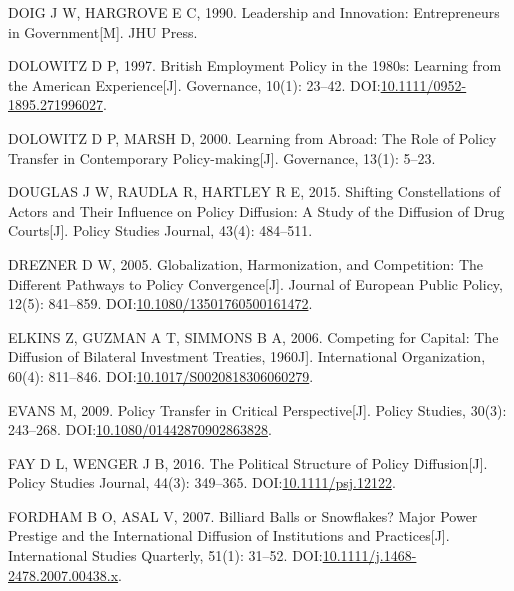 \documentclass[
  12pt,
]{ctexart}
\newlength{\cslhangindent}
\newlength{\cslentryspacingunit} %
\newenvironment{CSLReferences}[2] %
 {%
  \setlength{\parindent}{0pt}
  \ifodd #1
  \let\oldpar\par
  \def\par{\hangindent=\cslhangindent\oldpar}
  \fi
  \setlength{\parskip}{#2\cslentryspacingunit}
 }%
 {}
\begin{document}
\begin{CSLReferences}{1}{0}
\leavevmode{}%
DOIG J W, HARGROVE E C, 1990. Leadership and Innovation: {Entrepreneurs} in Government{[}M{]}. {JHU Press}.

\leavevmode{}%
DOLOWITZ D P, 1997. British {Employment Policy} in the 1980s: {Learning} from the {American Experience}{[}J{]}. Governance, 10(1): 23--42. DOI:\href{https://doi.org/10.1111/0952-1895.271996027}{10.1111/0952-1895.271996027}.

\leavevmode{}%
DOLOWITZ D P, MARSH D, 2000. Learning from Abroad: {The} Role of Policy Transfer in Contemporary Policy-making{[}J{]}. Governance, 13(1): 5--23.

\leavevmode{}%
DOUGLAS J W, RAUDLA R, HARTLEY R E, 2015. Shifting Constellations of Actors and Their Influence on Policy Diffusion: {A} Study of the Diffusion of Drug Courts{[}J{]}. Policy Studies Journal, 43(4): 484--511.

\leavevmode{}%
DREZNER D W, 2005. Globalization, Harmonization, and Competition: The Different Pathways to Policy Convergence{[}J{]}. Journal of European Public Policy, 12(5): 841--859. DOI:\href{https://doi.org/10.1080/13501760500161472}{10.1080/13501760500161472}.

\leavevmode{}%
ELKINS Z, GUZMAN A T, SIMMONS B A, 2006. Competing for {Capital}: {The Diffusion} of {Bilateral Investment Treaties}, 1960\textendash 2000{[}J{]}. International Organization, 60(4): 811--846. DOI:\href{https://doi.org/10.1017/S0020818306060279}{10.1017/S0020818306060279}.

\leavevmode{}%
EVANS M, 2009. Policy Transfer in Critical Perspective{[}J{]}. Policy Studies, 30(3): 243--268. DOI:\href{https://doi.org/10.1080/01442870902863828}{10.1080/01442870902863828}.

\leavevmode{}%
FAY D L, WENGER J B, 2016. The {Political Structure} of {Policy Diffusion}{[}J{]}. Policy Studies Journal, 44(3): 349--365. DOI:\href{https://doi.org/10.1111/psj.12122}{10.1111/psj.12122}.

\leavevmode{}%
FORDHAM B O, ASAL V, 2007. Billiard {Balls} or {Snowflakes}? {Major Power Prestige} and the {International Diffusion} of {Institutions} and {Practices}{[}J{]}. International Studies Quarterly, 51(1): 31--52. DOI:\href{https://doi.org/10.1111/j.1468-2478.2007.00438.x}{10.1111/j.1468-2478.2007.00438.x}.


\end{CSLReferences}
\end{document}
